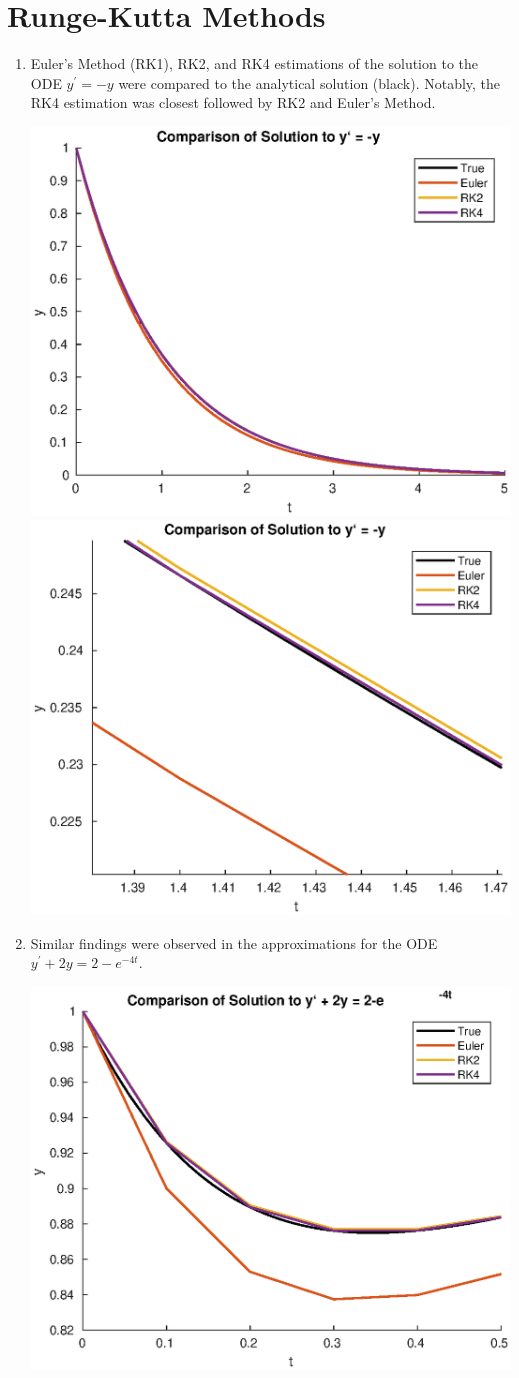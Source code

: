 \documentclass[12pt]{extarticle}
\begin{document}
\newpage
\section{Runge-Kutta Methods}
\begin{enumerate}

\item Euler's Method (RK1), RK2, and RK4 estimations of the solution to the ODE $y^{\prime} = -y$ were compared to the analytical solution (black). Notably, the RK4 estimation was closest followed by RK2 and Euler's Method.
\begin{center}
\includegraphics[width = .47\textwidth]{comp1}
\includegraphics[width = .43\textwidth]{zoomed_in}
\end{center}

\item Similar findings were observed in the approximations for the ODE $y^{\prime} + 2y = 2-e^{-4t}$. 
\begin{center}
\includegraphics[width = .65\textwidth]{comp2}
\end{center}
\end{enumerate}
\end{document}
